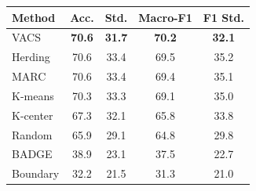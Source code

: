 \begin{tabular}{lcccc}
\toprule
Method & Acc. & Std. & Macro-F1 & F1 Std. \\
\midrule
VACS & \textbf{70.6} & \textbf{31.7} & \textbf{70.2} & \textbf{32.1} \\
Herding & 70.6 & 33.4 & 69.5 & 35.2 \\
MARC & 70.6 & 33.4 & 69.4 & 35.1 \\
K-means & 70.3 & 33.3 & 69.1 & 35.0 \\
K-center & 67.3 & 32.1 & 65.8 & 33.8 \\
Random & 65.9 & 29.1 & 64.8 & 29.8 \\
BADGE & 38.9 & 23.1 & 37.5 & 22.7 \\
Boundary & 32.2 & 21.5 & 31.3 & 21.0 \\
\bottomrule
\end{tabular}
